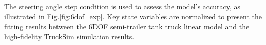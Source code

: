 The steering angle step condition is used to assess the model's accuracy, as illustrated in Fig.\ref{fig:6dof_exp}. Key state variables are normalized to present the fitting results between the 6DOF semi-trailer tank truck linear model and the high-fidelity TruckSim simulation results.














